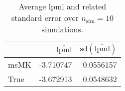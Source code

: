 \begin{table}[H]

\caption{Average lpml and related standard error over $n_{\text{sim}} = 10$ simulations.}
\centering
\begin{tabular}[t]{lrr}
\toprule
  & $\overbar{\text{lpml}}$ & $\text{sd}(\overbar{\text{lpml}})$\\
\midrule
msMK & -3.710747 & 0.0556157\\
True & -3.672913 & 0.0548632\\
\bottomrule
\end{tabular}
\end{table}